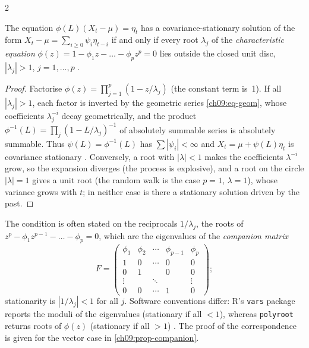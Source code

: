 \begin{paracol}{2}
\begin{theorem}[Stationarity of AR($p$)]\label{ch09:thm-ar-stat}
The equation $\phi(L)(X_t-\mu)=\eta_t$ has a covariance-stationary solution of the form
$X_t-\mu=\sum_{i\ge0}\psi_i\eta_{t-i}$ if and only if every root $\lambda_j$ of the
\emph{characteristic equation} $\phi(z)=1-\phi_1z-\dots-\phi_pz^p=0$ lies outside the closed unit
disc, $|\lambda_j|>1$, $j=1,\dots,p$ .
\end{theorem}
\begin{proof}
Factorise $\phi(z)=\prod_{j=1}^p(1-z/\lambda_j)$ (the constant term is~1). If all $|\lambda_j|>1$,
each factor is inverted by the geometric series \eqref{ch09:eq-geom}, whose coefficients $\lambda_j^{-i}$ decay
geometrically, and the product $\phi^{-1}(L)=\prod_j(1-L/\lambda_j)^{-1}$ of absolutely summable series is
absolutely summable. Thus $\psi(L)=\phi^{-1}(L)$ has $\sum|\psi_i|<\infty$ and $X_t=\mu+\psi(L)\eta_t$ is
covariance stationary . Conversely, a root with $|\lambda|<1$ makes
the coefficients $\lambda^{-i}$ grow, so the expansion diverges (the process is explosive), and a root on
the circle $|\lambda|=1$ gives a unit root (the random walk is the case $p=1$, $\lambda=1$), whose variance
grows with $t$; in neither case is there a stationary solution driven by the past.
\end{proof}

\begin{remark}\label{ch09:rem-companion}
The condition is often stated on the reciprocals $1/\lambda_j$, the roots of $z^p-\phi_1z^{p-1}-\dots-\phi_p=0$,
which are the eigenvalues of the \emph{companion matrix}
\[
  F=\begin{pmatrix}\phi_1&\phi_2&\cdots&\phi_{p-1}&\phi_p\\ 1&0&\cdots&0&0\\ 0&1&&0&0\\ \vdots&&\ddots&&\vdots\\ 0&0&\cdots&1&0\end{pmatrix};
\]
stationarity is $|1/\lambda_j|<1$ for all $j$. Software conventions differ: R's \texttt{vars} package reports
the moduli of the eigenvalues (stationary if all $<1$), whereas \texttt{polyroot} returns roots of $\phi(z)$
(stationary if all $>1$) . The proof of the correspondence is given for the vector case in
\cref{ch09:prop-companion}.
\end{remark}


\end{paracol}
